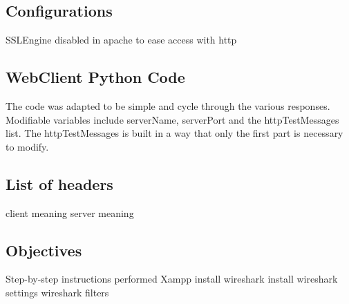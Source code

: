\documentclass[11pt,a4paper]{report}
\begin{document}
    \subsection{Configurations}
        SSLEngine disabled in apache to ease access with http
    
    \subsection{WebClient Python Code}
        \lstset{style=pythoncode}
        
        The code was adapted to be simple and cycle through the various responses.
        Modifiable variables include serverName, serverPort and the httpTestMessages list.
        The httpTestMessages is built in a way that only the first part is necessary to modify.
    
    \subsection{List of headers}
        client
            meaning
        server
            meaning
    
    \subsection{Objectives}
        Step-by-step instructions performed
        Xampp install
        wireshark install
        wireshark settings
        wireshark filters
        
\end{document}
